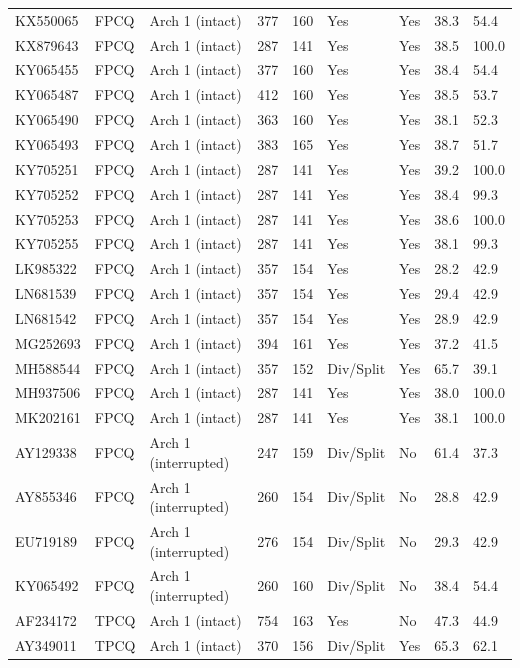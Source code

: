 \documentclass[10pt,letterpaper]{article}
\begin{document}
{\begin{longtable}{@{}lllllllll@{}}
KX550065 & FPCQ & Arch 1 (intact) & 377 & 160 & Yes & Yes & 38.3 & 54.4 \\
KX879643 & FPCQ & Arch 1 (intact) & 287 & 141 & Yes & Yes & 38.5 & 100.0 \\
KY065455 & FPCQ & Arch 1 (intact) & 377 & 160 & Yes & Yes & 38.4 & 54.4 \\
KY065487 & FPCQ & Arch 1 (intact) & 412 & 160 & Yes & Yes & 38.5 & 53.7 \\
KY065490 & FPCQ & Arch 1 (intact) & 363 & 160 & Yes & Yes & 38.1 & 52.3 \\
KY065493 & FPCQ & Arch 1 (intact) & 383 & 165 & Yes & Yes & 38.7 & 51.7 \\
KY705251 & FPCQ & Arch 1 (intact) & 287 & 141 & Yes & Yes & 39.2 & 100.0 \\
KY705252 & FPCQ & Arch 1 (intact) & 287 & 141 & Yes & Yes & 38.4 & 99.3 \\
KY705253 & FPCQ & Arch 1 (intact) & 287 & 141 & Yes & Yes & 38.6 & 100.0 \\
KY705255 & FPCQ & Arch 1 (intact) & 287 & 141 & Yes & Yes & 38.1 & 99.3 \\
LK985322 & FPCQ & Arch 1 (intact) & 357 & 154 & Yes & Yes & 28.2 & 42.9 \\
LN681539 & FPCQ & Arch 1 (intact) & 357 & 154 & Yes & Yes & 29.4 & 42.9 \\
LN681542 & FPCQ & Arch 1 (intact) & 357 & 154 & Yes & Yes & 28.9 & 42.9 \\
MG252693 & FPCQ & Arch 1 (intact) & 394 & 161 & Yes & Yes & 37.2 & 41.5 \\
MH588544 & FPCQ & Arch 1 (intact) & 357 & 152 & Div/Split & Yes & 65.7 & 39.1 \\
MH937506 & FPCQ & Arch 1 (intact) & 287 & 141 & Yes & Yes & 38.0 & 100.0 \\
MK202161 & FPCQ & Arch 1 (intact) & 287 & 141 & Yes & Yes & 38.1 & 100.0 \\
AY129338 & FPCQ & Arch 1 (interrupted) & 247 & 159 & Div/Split & No & 61.4 & 37.3 \\
AY855346 & FPCQ & Arch 1 (interrupted) & 260 & 154 & Div/Split & No & 28.8 & 42.9 \\
EU719189 & FPCQ & Arch 1 (interrupted) & 276 & 154 & Div/Split & No & 29.3 & 42.9 \\
KY065492 & FPCQ & Arch 1 (interrupted) & 260 & 160 & Div/Split & No & 38.4 & 54.4 \\
AF234172 & TPCQ & Arch 1 (intact) & 754 & 163 & Yes & No & 47.3 & 44.9 \\
AY349011 & TPCQ & Arch 1 (intact) & 370 & 156 & Div/Split & Yes & 65.3 & 62.1 \\

\end{longtable}}
\end{document}
